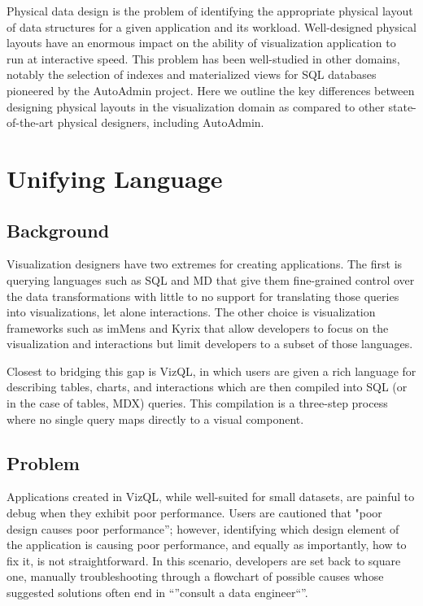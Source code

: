 Physical data design is the problem of identifying the appropriate physical layout of data structures for a given application and its workload.  Well-designed physical layouts have an enormous impact on the ability of visualization application to run at interactive speed. This problem has been well-studied in other domains, notably the selection of indexes and materialized views for SQL databases pioneered by the AutoAdmin project. Here we outline the key differences between designing physical layouts in the visualization domain as compared to other state-of-the-art physical designers, including AutoAdmin. 

\section{Unifying Language} 
\subsection{Background} Visualization designers have two extremes for creating applications. The first is querying languages such as SQL and MD that give them fine-grained control over the data transformations with little to no support for translating those queries into visualizations, let alone interactions. The other choice is visualization frameworks such as imMens and Kyrix that allow developers to focus on the visualization and interactions but limit developers to a subset of those languages.

Closest to bridging this gap is VizQL, in which users are given a rich language for describing tables, charts, and interactions which are then compiled into SQL (or in the case of tables, MDX) queries.  This compilation is a three-step process where no single query maps directly to a visual component.

\subsection{Problem}
Applications created in VizQL, while well-suited for small datasets, are painful to debug when they exhibit poor performance. Users are cautioned that "poor design causes poor performance''; however, identifying which design element of the application is causing poor performance, and equally as importantly, how to fix it, is not straightforward. In this scenario, developers are set back to square one, manually troubleshooting through a flowchart of possible causes whose suggested solutions often end in ``''consult a data engineer``''. 

